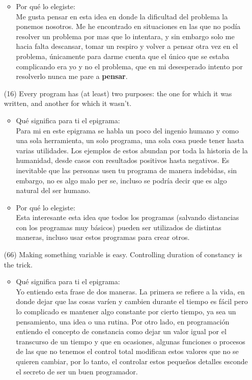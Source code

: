 \documentclass{article}
\begin{document}
\begin{itemize}
\begin{itemize}
        \item Por qué lo elegiste:\\
        Me gusta pensar en esta idea en donde la dificultad del problema la ponemos nosotros. Me he encontrado en situaciones en las que no podía resolver un problema por mas que lo intentara, y sin embargo solo me hacia falta descansar, tomar un respiro y volver a pensar otra vez en el problema, únicamente para darme cuenta que el único que se estaba complicando era yo y no el problema, que en mi desesperado intento por resolverlo nunca me pare a \textbf{pensar}.
    \end{itemize}
    \item[(16)]Every program has (at least) two purposes: the one for which it was written, and another for which it wasn’t.
    \begin{itemize}
        \item Qué significa para ti el epigrama:\\
        Para mi en este epigrama se habla un poco del ingenio humano y como una sola herramienta, un solo programa, una sola cosa puede tener hasta varias utilidades. Los ejemplos de estos abundan por toda la historia de la humanidad, desde casos con resultados positivos hasta negativos. Es inevitable que las personas usen tu programa de manera indebidas, sin embargo, no es algo malo per se, incluso se podría decir que es algo natural del ser humano.
        \item Por qué lo elegiste:\\
        Esta interesante esta idea que todos los programas (salvando distancias con los programas muy básicos) pueden ser utilizados de distintas maneras, incluso usar estos programas para crear otros.
    \end{itemize}
    \item[(66)]Making something variable is easy. Controlling duration of constancy is the trick.
    \begin{itemize}
        \item Qué significa para ti el epigrama:\\
        Yo entiendo esta frase de dos maneras. La primera se refiere a la vida, en donde dejar que las cosas varíen y cambien durante el tiempo es fácil pero lo complicado es mantener algo constante por cierto tiempo, ya sea un pensamiento, una idea o una rutina. Por otro lado, en programación entiendo el concepto de constancia como dejar un valor igual por el transcurso de un tiempo y que en ocasiones, algunas funciones o procesos de las que no tenemos el control total modifican estos valores que no se quieren cambiar, por lo tanto, el controlar estos pequeños detalles esconde el secreto de ser un buen programador.

\end{itemize}
\end{itemize}
\end{document}
